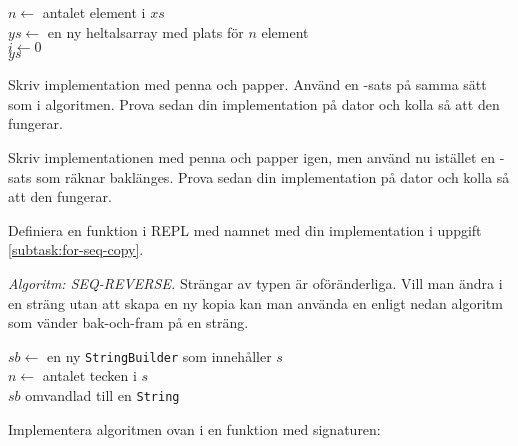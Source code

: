 \begin{algorithm}[H]

 $n \leftarrow$ antalet element i $xs$ \\
 $ys \leftarrow$ en ny heltalsarray med plats för $n$ element\\
 $i \leftarrow 0$  \\
 \Return $ys$
\end{algorithm}

\Subtask\Pen Skriv implementation med penna och papper. Använd en -sats på samma sätt som i algoritmen. Prova sedan din implementation på dator och kolla så att den fungerar.

\Subtask\Pen \label{subtask:for-seq-copy} Skriv implementationen med penna och papper igen, men använd nu istället en -sats som räknar baklänges. Prova sedan din implementation på dator och kolla så att den fungerar.

\Subtask Definiera en funktion i REPL med namnet  med din implementation i uppgift \ref{subtask:for-seq-copy}.


\Task \emph{Algoritm: SEQ-REVERSE.} Strängar av typen  är oföränderliga. Vill man ändra i en sträng utan att skapa en ny kopia kan man använda en  enligt nedan algoritm som vänder bak-och-fram på en sträng.

\begin{algorithm}[H]

 $sb \leftarrow$ en ny \texttt{StringBuilder} som innehåller $s$ \\
 $n \leftarrow$ antalet tecken i $s$\\
 \Return $sb$ omvandlad till en \texttt{String}
\end{algorithm}

\Subtask Implementera algoritmen ovan i en funktion med signaturen: \\

